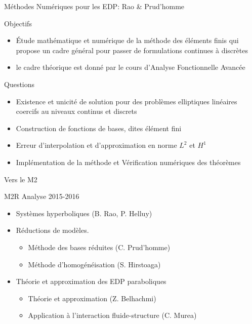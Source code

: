 \documentclass{beamer}
\begin{document}
\begin{frame}{Méthodes Numériques pour les EDP: Rao \& Prud'homme}
  \begin{block}{Objectifs}
    \begin{itemize}
    \item {\'E}tude math{\'e}matique et num{\'e}rique de la m{\'e}thode des {\'e}l{\'e}ments
      finis qui propose un cadre g{\'e}n{\'e}ral pour passer de formulations
      continues {\`a} discr{\`e}tes
    \item le cadre th{\'e}orique est donn{\'e} par le cours d'Analyse
      Fonctionnelle Avanc{\'e}e
    \end{itemize}
  \end{block}
  \begin{block}{Questions}
    \begin{itemize}
    \item Existence et unicit{\'e} de solution pour des probl{\`e}mes
      elliptiques lin{\'e}aires coercifs au niveaux continus et discrets
    \item Construction de fonctions de bases, dites {\'e}l{\'e}ment fini
    \item Erreur d'interpolation et d'approximation en norme $L^2$ et $H^1$
    \item Impl{\'e}mentation de la m{\'e}thode et V{\'e}rification num{\'e}riques des th{\'e}or{\`e}mes
    \end{itemize}
  \end{block}
\end{frame}

\begin{frame}{Vers le M2}

  \begin{block}{M2R Analyse 2015-2016}
    \begin{itemize}
    \item Systèmes hyperboliques (B. Rao, P. Helluy)
    \item Réductions de modèles.
      \begin{itemize}
      \item Méthode des bases réduites (C. Prud'homme)
      \item Méthode d'homogénéisation (S. Hirstoaga)
      \end{itemize}
    \item Théorie et approximation des EDP paraboliques
      \begin{itemize}
      \item Théorie et approximation (Z. Belhachmi)
      \item Application à l'interaction
        fluide-structure (C. Murea)
      \end{itemize}
    \end{itemize}
  \end{block}

\end{frame}
\end{document}
